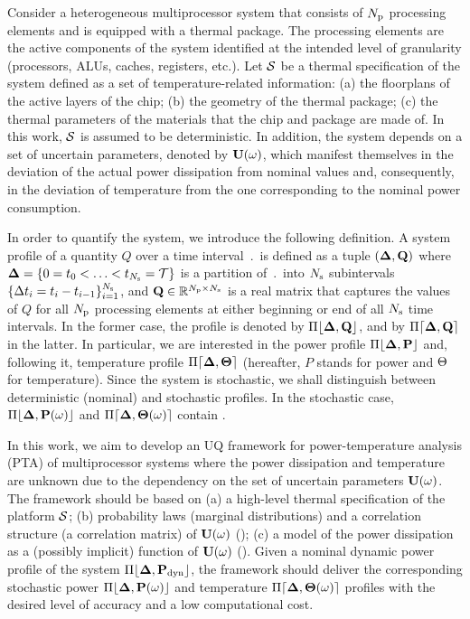 
Consider a heterogeneous multiprocessor system that consists of ${N_\text{p}}$ processing elements and is equipped with a thermal package. The processing elements are the active components of the system identified at the intended level of granularity (processors, ALUs, caches, registers, etc.). Let $\mathcal{S}$ be a thermal specification of the system defined as a set of temperature-related information: (a) the floorplans of the active layers of the chip; (b) the geometry of the thermal package; (c) the thermal parameters of the materials that the chip and package are made of. In this work, $\mathcal{S}$ is assumed to be deterministic. In addition, the system depends on a set of uncertain parameters, denoted by $\mathbf{U}(\omega)$, which manifest themselves in the deviation of the actual power dissipation from nominal values and, consequently, in the deviation of temperature from the one corresponding to the nominal power consumption.

In order to quantify the system, we introduce the following definition. A system profile of a quantity $Q$ over a time interval $\period$ is defined as a tuple $(\part, \m{Q})$ where $\boldsymbol{\Delta} = \{ 0 = t_0 < \dotsc < t_{N_\text{s}} = \mathcal{T} \}$ is a partition of $\period$ into $N_\text{s}$ subintervals $\{ \Delta t_i = t_i - t_{i - 1} \}_{i = 1}^{N_\text{s}}$, and $\m{Q} \in \real^{\cores \times \steps}$ is a real matrix that captures the values of $Q$ for all ${N_\text{p}}$ processing elements at either beginning or end of all $N_\text{s}$ time intervals. In the former case, the profile is denoted by $\profB{\m{Q}}$, and by $\profE{\m{Q}}$ in the latter. In particular, we are interested in the power profile $\profP$ and, following it, temperature profile $\profT$ (hereafter, $P$ stands for power and $\Theta$ for temperature). Since the system is stochastic, we shall distinguish between deterministic (nominal) and stochastic profiles. In the stochastic case, $\profP{\o}$ and $\profT{\o}$ contain \rvs.

In this work, we aim to develop an UQ framework for power-temperature analysis (PTA) of multiprocessor systems where the power dissipation and temperature are unknown due to the dependency on the set of uncertain parameters $\mathbf{U}(\omega)$. The framework should be based on (a) a high-level thermal specification of the platform $\mathcal{S}$; (b) probability laws (marginal distributions) and a correlation structure (a correlation matrix) of $\mathbf{U}(\omega)$ (); (c) a model of the power dissipation as a (possibly implicit) function of $\mathbf{U}(\omega)$ (). Given a nominal dynamic power profile of the system $\profPdyn$, the framework should deliver the corresponding stochastic power $\profP{\o}$ and temperature $\profT{\o}$ profiles with the desired level of accuracy and a low computational cost.
